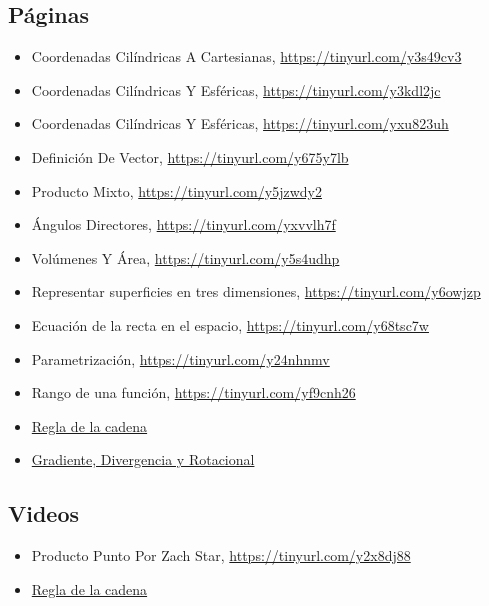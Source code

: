\documentclass{article}
\begin{document}
\subsection{Páginas}
\label{sec:orgf9d5e83}
\begin{itemize}
\item Coordenadas Cilíndricas A Cartesianas, \url{https://tinyurl.com/y3s49cv3}
\item Coordenadas Cilíndricas Y Esféricas, \url{https://tinyurl.com/y3kdl2jc}
\item Coordenadas Cilíndricas Y Esféricas, \url{https://tinyurl.com/yxu823uh}
\item Definición De Vector, \url{https://tinyurl.com/y675y7lb}
\item Producto Mixto, \url{https://tinyurl.com/y5jzwdy2}
\item Ángulos Directores, \url{https://tinyurl.com/yxvvlh7f}
\item Volúmenes Y Área, \url{https://tinyurl.com/y5s4udhp}
\item Representar superficies en tres dimensiones, \url{https://tinyurl.com/y6owjzp}
\item Ecuación de la recta en el espacio, \url{https://tinyurl.com/y68tsc7w}
\item Parametrización, \url{https://tinyurl.com/y24nhnmv}
\item Rango de una función, \url{https://tinyurl.com/yf9cnh26}
\item \href{http://www.mate.unlp.edu.ar/practicas/54\_6\_15102013091531.pdf}{Regla de la cadena}
\item \href{https://www.ugr.es/\~rpaya/documentos/Teleco/Fund-Mat02.pdf}{Gradiente, Divergencia y Rotacional}
\end{itemize}

\subsection{Videos}
\label{sec:orge1d67a4}
\begin{itemize}
\item Producto Punto Por Zach Star, \url{https://tinyurl.com/y2x8dj88}
\item \href{https://www.youtube.com/watch?v=DFn9wUEBnbU\&t=134s}{Regla de la cadena}
\end{itemize}
\end{document}
